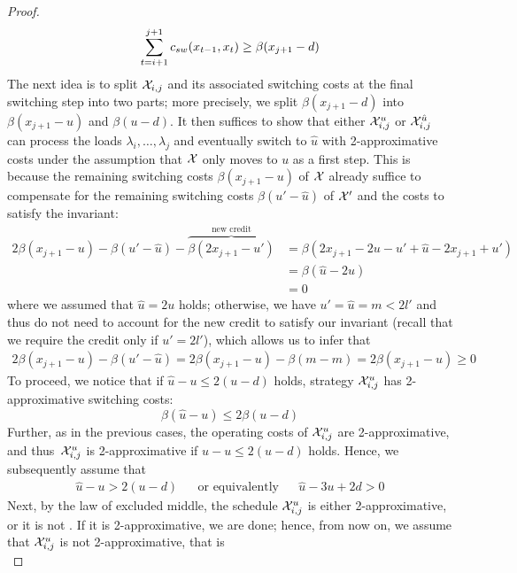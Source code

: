\begin{proof}
\begin{equation*}
	\sum\limits_{t=i+1}^{j+1}c_{sw}(x_{t-1},x_t)\ge\beta(x_{j+1}-d)
\end{equation*}
The next idea is to split $\mathcal{X}_{i,j}$ and its associated switching costs at the final switching step into two parts; more precisely, we split $\beta(x_{j+1}-d)$ into $\beta(x_{j+1}-u)$ and $\beta(u-d)$. It then suffices to show that either $\mathcal{X}_{i,j}^u$ or $\mathcal{X}_{i,j}^{\hat{u}}$ can process the loads $\lambda_i,\dotsc,\lambda_j$ and eventually switch to $\hat{u}$ with 2-approximative costs under the assumption that $\mathcal{X}$ only moves to $u$ as a first step. This is because the remaining switching costs $\beta(x_{j+1}-u)$ of $\mathcal{X}$ already suffice to compensate for the remaining switching costs $\beta(u'-\hat{u})$ of $\mathcal{X}'$ and the costs to satisfy the invariant:
\begin{align*}
	2\beta(x_{j+1}-u)-\beta(u'-\hat{u})-\overbrace{\beta(2x_{j+1}-u')}^{\text{new credit}}&=\beta(2x_{j+1}-2u-u'+\hat{u}-2x_{j+1}+u')\\
	&=\beta(\hat{u}-2u)\\
	&=0
\end{align*}
where we assumed that $\hat{u}=2u$ holds; otherwise, we have $u'=\hat{u}=m<2l'$ and thus do not need to account for the new credit to satisfy our invariant (recall that we require the credit only if $u'=2l'$), which allows us to infer that
\begin{align*}
	2\beta(x_{j+1}-u)-\beta(u'-\hat{u})=2\beta(x_{j+1}-u)-\beta(m-m)=2\beta(x_{j+1}-u)\ge 0
\end{align*}
To proceed, we notice that if $\hat{u}-u\le2(u-d)$ holds, strategy $\mathcal{X}_{i,j}^u$ has 2-approximative switching costs:
\begin{equation*}
	\beta(\hat{u}-u)\le2\beta(u-d)
\end{equation*}
Further, as in the previous cases, the operating costs of $\mathcal{X}_{i,j}^u$ are 2-approximative, and thus~$\mathcal{X}_{i,j}^u$ is 2-approximative if $\hat{u}-u\le2(u-d)$ holds. Hence, we subsequently assume that 
\begin{align}\label{eq:proof_2_approximative_asm_dist_pos}
	\hat{u}-u>2(u-d)&&\text{or equivalently}&&\hat{u}-3u+2d>0
\end{align}
Next, by the law of excluded middle, the schedule $\mathcal{X}_{i,j}^u$ is either 2-approximative, or it is not . If it is 2-approximative, we are done; hence, from now on, we assume that $\mathcal{X}_{i,j}^u$ is not 2-approximative, that is
\begin{equation*}

\end{equation*}
\end{proof}
